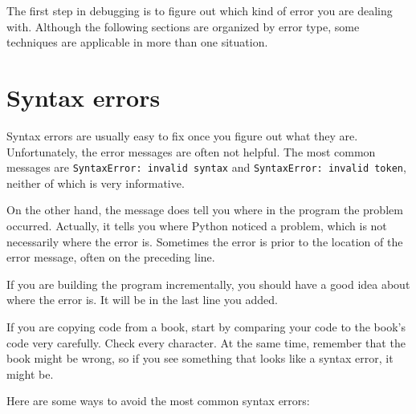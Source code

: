 \documentclass[10pt]{book}
\begin{document}
The first step in debugging is to figure out which kind of
error you are dealing with.  Although the following sections are
organized by error type, some techniques are
applicable in more than one situation.


\section{Syntax errors}

Syntax errors are usually easy to fix once you figure out what they
are.  Unfortunately, the error messages are often not helpful.
The most common messages are {\tt SyntaxError: invalid syntax} and
{\tt SyntaxError: invalid token}, neither of which is very informative.

On the other hand, the message does tell you where in the program the
problem occurred.  Actually, it tells you where Python
noticed a problem, which is not necessarily where the error
is.  Sometimes the error is prior to the location of the error
message, often on the preceding line.

If you are building the program incrementally, you should have
a good idea about where the error is.  It will be in the last
line you added.

If you are copying code from a book, start by comparing
your code to the book's code very carefully.  Check every character.
At the same time, remember that the book might be wrong, so
if you see something that looks like a syntax error, it might be.

Here are some ways to avoid the most common syntax errors:
\end{document}
